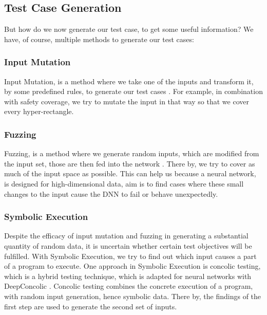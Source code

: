 \subsection*{Test Case Generation}
But how do we now generate our test case, to get some useful information?
We have, of course, multiple methods to generate our test cases:

\subsubsection{Input Mutation}
Input Mutation, is a method where we take one of the inputs and transform it, by some predefined rules, to generate our test cases .
For example, in combination with safety coverage, we try to mutate the input in that way so that we cover every hyper-rectangle.
\subsubsection{Fuzzing}
Fuzzing, is a method where we generate random inputs, which are modified from the input set, those are then fed into the network \cite{beyer_feature-guided_2018}.
There by, we try to cover as much of the input space as possible.
This can help us because a neural network, is designed for high-dimensional data, aim is to find cases where these small changes to the input cause the DNN to fail or behave unexpectedly.

\subsubsection{Symbolic Execution}
Despite the efficacy of input mutation and fuzzing in generating a substantial quantity of random data, it is uncertain whether certain test objectives will be fulfilled.
With Symbolic Execution, we try to find out which input causes a part of a program to execute.
One approach in Symbolic Execution is concolic testing, which is a hybrid testing technique, which is adapted for neural networks with DeepConcolic \cite{sun_deepconcolic_2019}.
Concolic testing combines the concrete execution of a program, with random input generation, hence symbolic data.
There by, the findings of the first step are used to generate the second set of inputs.

